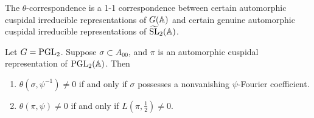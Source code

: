 \begin{theorem}
\label{thm:3.2}
The $\theta$-correspondence  is a 1-1 correspondence between certain automorphic cuspidal irreducible representations of $G(\mathbb{A})$ and certain genuine automorphic cuspidal irreducible representations of $\widetilde{\mathrm{SL}}_2(\mathbb{A})$.
\end{theorem}


\begin{theorem}
\label{thm:3.3} 
Let $G = \mathrm{PGL}_2$. Suppose $\sigma \subset A_{00}$, and $\pi$ is an automorphic cuspidal representation of $\mathrm{PGL}_2(\mathbb{A})$. Then
\begin{enumerate}
    \item $\theta(\sigma, \psi^{-1}) \neq 0$ if and only if $\sigma$ possesses a nonvanishing $\psi$-Fourier coefficient.
    \item $\theta(\pi, \psi) \neq 0$ if and only if $L(\pi, \frac{1}{2}) \neq 0$.
\end{enumerate}
\end{theorem}


